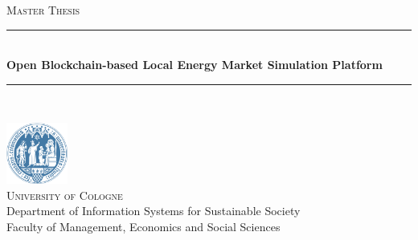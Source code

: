 \begin{titlepage}

    \newcommand{\HRule}{\rule{\linewidth}{0.1mm}} %

    \center %
	
   \textsc{\Large Master Thesis}\\[0.5cm] %
	    
    
    \HRule \\[0.4cm]
    { \huge \bfseries Open Blockchain-based Local Energy Market Simulation Platform}\\[0.7cm] %
    \HRule \\[0.4cm]
    
    \vspace{2cm}

    
    \includegraphics[width=0.15\textwidth]{img/uni_cologne.png}\\[1cm] %
    
   \textsc{\LARGE University of Cologne}\\[0.5cm] %
   
    \large
    Department of Information Systems for Sustainable Society\\
    Faculty of Management, Economics and Social Sciences\\
   
	\vspace{3cm}
	
    

\end{titlepage}
